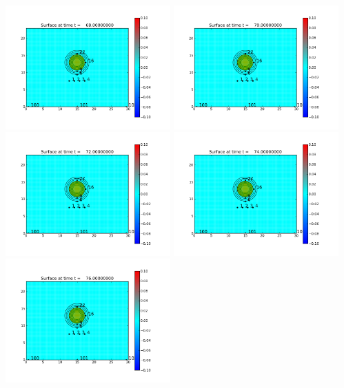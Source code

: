 \documentclass[11pt]{article}
\begin{document}
\vskip 10pt 
\includegraphics[width=0.475\textwidth]{frame0024fig0.png}
\vskip 10pt 
\includegraphics[width=0.475\textwidth]{frame0025fig0.png}
\vskip 10pt 
\includegraphics[width=0.475\textwidth]{frame0026fig0.png}
\vskip 10pt 
\includegraphics[width=0.475\textwidth]{frame0027fig0.png}
\vskip 10pt 
\includegraphics[width=0.475\textwidth]{frame0028fig0.png}
\end{document}
